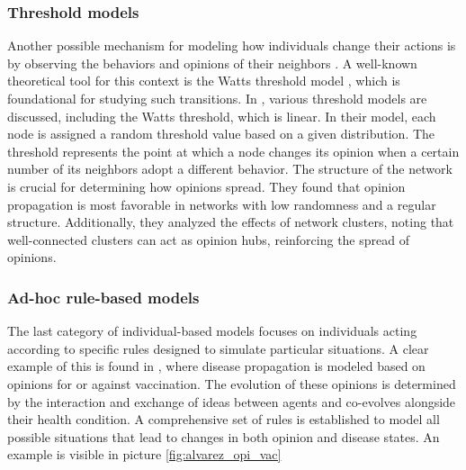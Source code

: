 \subsubsection{Threshold models}
Another possible mechanism for modeling how individuals change their actions is by observing the behaviors and opinions of their neighbors \cite{Granovetter_1978, Krassa_1988}. A well-known theoretical tool for this context is the Watts threshold model \cite{Watts_2002}, which is foundational for studying such transitions.
In \cite{Wang_2019}, various threshold models are discussed, including the Watts threshold, which is linear. In their model, each node is assigned a random threshold value based on a given distribution. The threshold represents the point at which a node changes its opinion when a certain number of its neighbors adopt a different behavior. The structure of the network is crucial for determining how opinions spread. They found that opinion propagation is most favorable in networks with low randomness and a regular structure. Additionally, they analyzed the effects of network clusters, noting that well-connected clusters can act as opinion hubs, reinforcing the spread of opinions.

\subsubsection{Ad-hoc rule-based models}
The last category of individual-based models focuses on individuals acting according to specific rules designed to simulate particular situations. A clear example of this is found in \cite{Alvarez_Zuzek_2017}, where disease propagation is modeled based on opinions for or against vaccination. The evolution of these opinions is determined by the interaction and exchange of ideas between agents and co-evolves alongside their health condition. A comprehensive set of rules is established to model all possible situations that lead to changes in both opinion and disease states. An example is visible in picture \ref{fig:alvarez_opi_vac}


